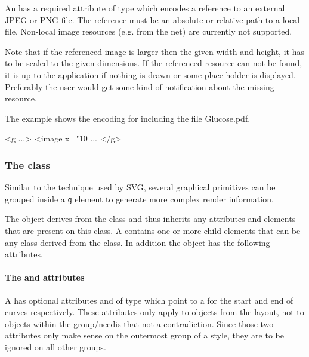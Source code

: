 An \Image has a required attribute  of type
 which encodes a reference to an external JPEG or PNG file. The reference must be an absolute or relative path to a local file.
Non-local image resources (e.g. from the net) are currently not supported.


Note that if the referenced image is larger then the given 
width and height, it has to be scaled to the given dimensions.
If the referenced resource can not be found, it is up to the application if nothing is drawn or some place holder is displayed.
Preferably the user would get some kind of notification about the missing resource.

The example shows the encoding for including the file Glucose.pdf.
{
\footnotesize
\begin{example}
 <g ...>
  <image x="10%
      ...
</g> 
\end{example}
}


\subsubsection{The  class}
\label{rendergroup-class}

Similar to the technique used by SVG, several graphical primitives can be grouped inside a \texttt{g} 
element to generate more complex render information.



The \RenderGroup object derives from the \GraphicalPrimitiveTwoD class
and thus inherits any attributes and elements that are present on this
class.
A \RenderGroup contains one or more child elements that can be any class derived from the \TransformationTwoD class.
In addition the \RenderGroup object has the following attributes.

\paragraph{The \fixttspace{} and \fixttspace{} attributes}

A \RenderGroup has optional attributes  and  of type
 which point to a \LineEnding for the start and end of curves respectively. These attributes only apply to \RenderCurve objects from the layout, not
to \RenderCurve objects within the group/need{is that not a contradiction}. Since those two attributes only make sense on the outermost group of a style,
they are to be ignored on all other groups. 

